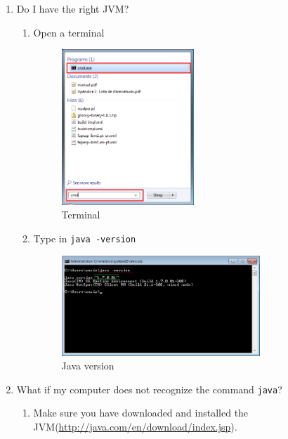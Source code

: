 \begin{enumerate}
	\item Do I have the right JVM?
	\begin{enumerate}
		\item Open a terminal
		\begin{figure}[H]\label{fig:terminal}
		\centering
		\includegraphics[width=0.5\textwidth]{img/step-by-step-win/1-open-cmd}
		\caption{Terminal}
		\end{figure}
		
		\item Type in {\tt java -version}
		\begin{figure}[H]\label{fig:version}
		\centering
		\includegraphics[width=0.75\textwidth]{img/step-by-step-win/2-java-version}
		\caption{Java version}
		\end{figure}
		
	\end{enumerate}
	
	\item What if my computer does not recognize the command {\tt java}?
	\begin{enumerate}
		\item Make sure you have downloaded and installed the JVM(\url{http://java.com/en/download/index.jsp}). 
	\end{enumerate}
	

\end{enumerate}
